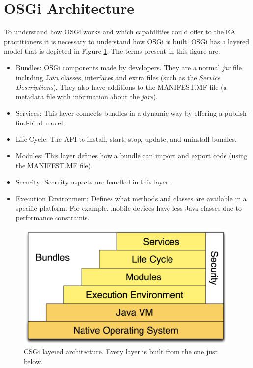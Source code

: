 \label{chap:appendixosgi}
\minitoc\mtcskip
\vfill
\section{OSGi Architecture}
To understand how OSGi \cite{Moussa2010ServiceComposition} works and which capabilities could offer to the EA practitioners it is necessary to understand how OSGi is built. OSGi has a layered model that is depicted in Figure \ref{fig:osgi-original}. The terms present in this figure are:

\begin{itemize}
\item Bundles: OSGi components made by developers. They are a normal {\em jar} file including Java classes, interfaces and extra files (such as the {\em Service Descriptions}). They also have additions to the MANIFEST.MF file (a metadata file with information about the {\em jars}).
\item Services: This layer connects bundles in a dynamic way by offering a publish-find-bind model.
\item Life-Cycle: The API to install, start, stop, update, and uninstall bundles.
\item Modules: This layer defines how a bundle can import and export code (using the MANIFEST.MF file).
\item Security: Security aspects are handled in this layer.
\item Execution Environment: Defines what methods and classes are available in a specific platform. For example, mobile devices have less Java classes due to performance constraints.
\end{itemize}

\begin{figure}
\centering
\includegraphics[width=26pc]{gfx/soa/osgi-oficial.jpg}
\caption{OSGi layered architecture. Every layer is built from the one just below.}
\label{fig:osgi-original}
\end{figure}






